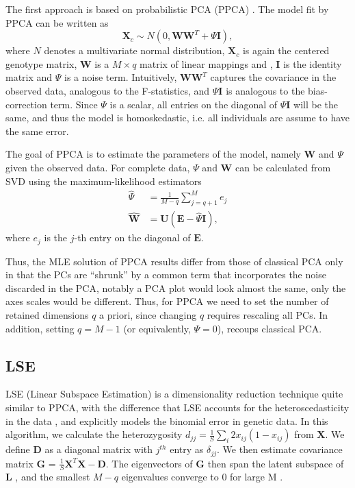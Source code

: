 \documentclass[12pt, letterpaper]{article}
\newcommand{\BI}{\mathbf{I}}
\newcommand{\MX}{\mathbf{X}}
\newcommand{\MG}{\mathbf{G}}
\begin{document}
The first approach is based on probabilistic PCA (PPCA) \cite{tipping_probabilistic_nodate, agrawal_scalable_2020}. The model fit by PPCA can be written as 
\begin{equation*}
    \MX_c \sim N(0, \mathbf{W}\mathbf{W}^T + \Psi \BI),
\end{equation*} 
where $N$ denotes a multivariate normal distribution, $\MX_c$ is again the centered genotype matrix, $\mathbf{W}$ is a $M \times q$ matrix of linear mappings and , $\BI$ is the identity matrix and $\Psi$ is a noise term. Intuitively, $\mathbf{W}\mathbf{W}^T$ captures the covariance in the observed data, analogous to the F-statistics, and $\Psi \BI$ is analogous to the bias-correction term. Since $\Psi$ is a scalar, all entries on the diagonal of $\Psi \BI$ will be the same, and thus the model is homoskedastic, i.e. all individuals are assume to have the same error.

The goal of PPCA is to estimate the parameters of the model, namely $\mathbf{W}$ and $\Psi$ given the observed data. For complete data, $\Psi$ and $\mathbf{W}$ can be calculated from SVD using the maximum-likelihood estimators
\begin{align*}
    \hat{\Psi} &= \frac{1}{M-q}\sum_{j=q+1}^M e_{j}\\
    \hat{\mathbf{W}} &= \mathbf{U}(\mathbf{E} - \hat{\Psi}\BI),
\end{align*}
where $e_j$ is the $j$-th entry on the diagonal of $\mathbf{E}$.

Thus, the MLE solution of PPCA results differ from those of classical PCA only in that the PCs are ``shrunk'' by a common term that incorporates the noise discarded in the PCA, notably a PCA plot would look almost the same, only the axes scales would be different. Thus, for PPCA we need to set the number of retained dimensions $q$ a priori, since changing $q$ requires rescaling all PCs. In addition, setting $q=M-1$ (or equivalently, $\Psi=0$), recoups classical PCA.


\subsection{LSE}\label{theory-lse}
LSE (Linear Subspace Estimation) is a dimensionality reduction technique quite similar to PPCA, with the difference that LSE accounts for the heteroscedasticity in the data \cite{chen_consistent_2015}, and explicitly models the binomial error in genetic data. In this algorithm, we calculate the heterozygosity  $d_{jj} = \frac{1}{S}\sum_i 2x_{ij}(1- x_{ij})$ from $\MX$. We define $\mathbf{D}$ as a diagonal matrix with $j^{th}$ entry as $\delta_{jj}$. We then estimate covariance matrix $\MG$ = $\frac{1}{S}\MX^T\MX - \mathbf{D}$. The eigenvectors of $\mathbf{G}$ then span the latent subspace of $\mathbf{L}$ , and the smallest $M-q$ eigenvalues converge to 0 for large M \cite{cabreros_likelihood-free_2019}.
\end{document}
